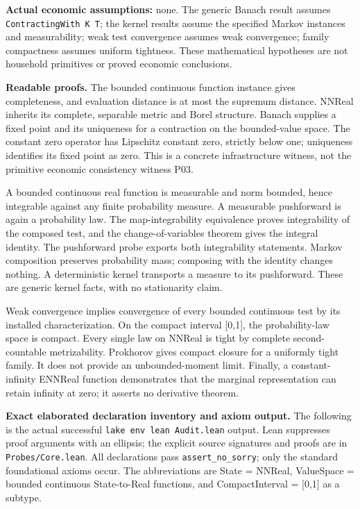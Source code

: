 \documentclass[
  11pt,
]{article}
\let\LedgerOriginalTexttt\texttt
\renewcommand{\texttt}[1]{{\small\LedgerOriginalTexttt{#1}}}
\begin{document}
\textbf{Actual economic assumptions:} none. The generic Banach result
assumes \texttt{ContractingWith\ K\ T}; the kernel results assume the
specified Markov instances and measurability; weak test convergence
assumes weak convergence; family compactness assumes uniform tightness.
These mathematical hypotheses are not household primitives or proved
economic conclusions.

\textbf{Readable proofs.} The bounded continuous function instance gives
completeness, and evaluation distance is at most the supremum distance.
NNReal inherits its complete, separable metric and Borel structure.
Banach supplies a fixed point and its uniqueness for a contraction on
the bounded-value space. The constant zero operator has Lipschitz
constant zero, strictly below one; uniqueness identifies its fixed point
as zero. This is a concrete infrastructure witness, not the primitive
economic consistency witness P03.

A bounded continuous real function is measurable and norm bounded, hence
integrable against any finite probability measure. A measurable
pushforward is again a probability law. The map-integrability
equivalence proves integrability of the composed test, and the
change-of-variables theorem gives the integral identity. The pushforward
probe exports both integrability statements. Markov composition
preserves probability mass; composing with the identity changes nothing.
A deterministic kernel transports a measure to its pushforward. These
are generic kernel facts, with no stationarity claim.

Weak convergence implies convergence of every bounded continuous test by
its installed characterization. On the compact interval {[}0,1{]}, the
probability-law space is compact. Every single law on NNReal is tight by
complete second-countable metrizability. Prokhorov gives compact closure
for a uniformly tight family. It does not provide an unbounded-moment
limit. Finally, a constant-infinity ENNReal function demonstrates that
the marginal representation can retain infinity at zero; it asserts no
derivative theorem.

\textbf{Exact elaborated declaration inventory and axiom output.} The
following is the actual successful \texttt{lake\ env\ lean\ Audit.lean}
output. Lean suppresses proof arguments with an ellipsis; the explicit
source signatures and proofs are in \texttt{Probes/Core.lean}. All
declarations pass \texttt{assert\_no\_sorry}; only the standard
foundational axioms occur. The abbreviations are State = NNReal,
ValueSpace = bounded continuous State-to-Real functions, and
CompactInterval = {[}0,1{]} as a subtype.
\end{document}
